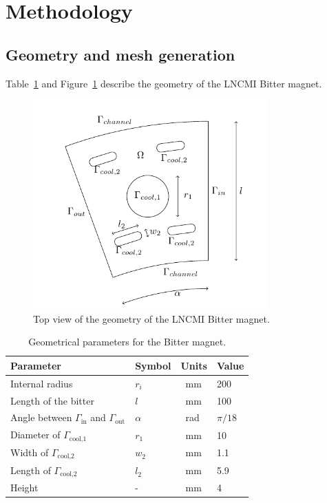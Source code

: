 \documentclass[12pt]{article}
\begin{document}
\section{Methodology}
\subsection{Geometry and mesh generation}

Table~\ref{tab:bitter_geometry} and Figure~\ref{fig:bitter_geometry} describe the
geometry of the LNCMI Bitter magnet.

\begin{figure}[H]
  \centering
  \includegraphics[width=0.8\textwidth]{images/top_view_bitter.png}
  \caption{Top view of the geometry of the LNCMI Bitter magnet.}
  \label{fig:bitter_geometry}
\end{figure}

\begin{table}[H]
  \centering
  \begin{tabular}{p{5cm}p{2cm}p{2cm}p{2cm}}
    \toprule
    \renewcommand{\arraystretch}{1.5} %
    \textbf{Parameter} & \textbf{Symbol} & \textbf{Units} & \textbf{Value} \\
    \midrule
    Internal radius & $r_i$ & \SI{}{mm} & 200 \\
    Length of the bitter & $l$ & \SI{}{mm} & 100 \\
    Angle between $\Gamma_\text{in}$ and $\Gamma_\text{out}$ & $\alpha$ & \SI{}{\radian} & $\pi/18$ \\
    Diameter of $\Gamma_\text{cool,1}$ & $r_1$ & \SI{}{mm} & 10 \\
    Width of $\Gamma_\text{cool,2}$ & $w_2$ & \SI{}{mm} & 1.1 \\
    Length of $\Gamma_\text{cool,2}$ & $l_2$ & \SI{}{mm} & 5.9 \\
    Height & - & \SI{}{mm} & 4 \\
    \bottomrule
  \end{tabular}
  \caption{Geometrical parameters for the Bitter magnet.}
  \label{tab:bitter_geometry}
\end{table}
\end{document}
